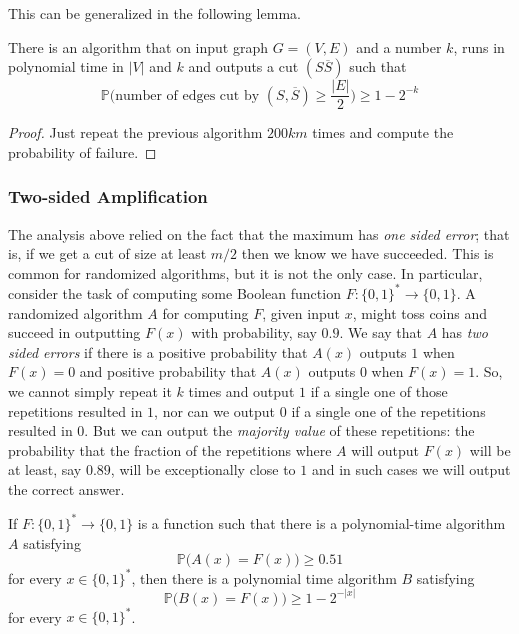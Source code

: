 \documentclass{article}
\begin{document}
  This can be generalized in the following lemma. 

  \begin{lemma}
  There is an algorithm that on input graph $G = (V, E)$ and a number $k$, runs in polynomial time in $|V|$ and $k$ and outputs a cut $(S \overline{S})$ such that
  \[\mathbb{P}\Big(\text{number of edges cut by } (S, \overline{S}) \geq \frac{|E|}{2} \Big) \geq 1 - 2^{-k}\]
  \end{lemma}
  \begin{proof}
  Just repeat the previous algorithm $200km$ times and compute the probability of failure. 
  \end{proof}

  \subsubsection{Two-sided Amplification}
  The analysis above relied on the fact that the maximum has \textit{one sided error}; that is, if we get a cut of size at least $m/2$ then we know we have succeeded. This is common for randomized algorithms, but it is not the only case. In particular, consider the task of computing some Boolean function $F: \{0,1\}^* \longrightarrow \{0,1\}$. A randomized algorithm $A$ for computing $F$, given input $x$, might toss coins and succeed in outputting $F(x)$ with probability, say $0.9$. We say that $A$ has \textit{two sided errors} if there is a positive probability that $A(x)$ outputs $1$ when $F(x) = 0$ and positive probability that $A(x)$ outputs $0$ when $F(x) = 1$. So, we cannot simply repeat it $k$ times and output $1$ if a single one of those repetitions resulted in $1$, nor can we output $0$ if a single one of the repetitions resulted in $0$. But we can output the \textit{majority value} of these repetitions: the probability that the fraction of the repetitions where $A$ will output $F(x)$ will be at least, say $0.89$, will be exceptionally close to $1$ and in such cases we will output the correct answer. 

  \begin{theorem}
  If $F: \{0,1\}^* \longrightarrow \{0,1\}$ is a function such that there is a polynomial-time algorithm $A$ satisfying 
  \[\mathbb{P} \big( A(x) = F(x) \big) \geq 0.51\]
  for every $x \in \{0,1\}^*$, then there is a polynomial time algorithm $B$ satisfying
  \[\mathbb{P} \big( B(x) = F(x) \big) \geq 1 - 2^{-|x|}\]
  for every $x \in \{0,1\}^*$. 
  \end{theorem}
\end{document}
